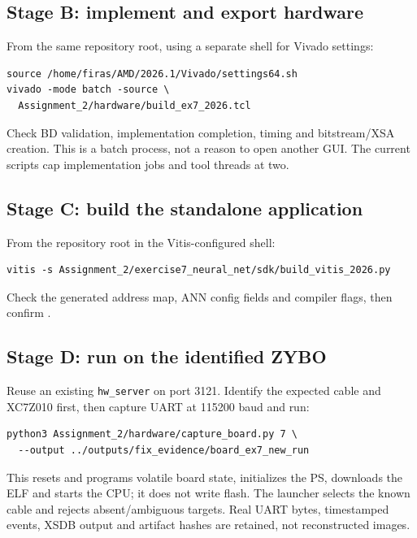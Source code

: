 \documentclass[11pt,a4paper]{article}
\begin{document}
\subsection*{Stage B: implement and export hardware}
From the same repository root, using a separate shell for Vivado settings:
\begin{lstlisting}
source /home/firas/AMD/2026.1/Vivado/settings64.sh
vivado -mode batch -source \
  Assignment_2/hardware/build_ex7_2026.tcl
\end{lstlisting}
Check BD validation, implementation completion, timing and bitstream/XSA
creation. This is a batch process, not a reason to open another GUI. The current
scripts cap implementation jobs and tool threads at two.

\subsection*{Stage C: build the standalone application}
From the repository root in the Vitis-configured shell:
\begin{lstlisting}
vitis -s Assignment_2/exercise7_neural_net/sdk/build_vitis_2026.py
\end{lstlisting}
Check the generated address map, ANN config fields and compiler flags, then
confirm .

\subsection*{Stage D: run on the identified ZYBO}
Reuse an existing \texttt{hw\_server} on port 3121. Identify the expected cable
and XC7Z010 first, then capture UART at 115200 baud and run:
\begin{lstlisting}
python3 Assignment_2/hardware/capture_board.py 7 \
  --output ../outputs/fix_evidence/board_ex7_new_run
\end{lstlisting}
This resets and programs volatile board state, initializes the PS, downloads
the ELF and starts the CPU; it does not write flash. The launcher selects the
known cable and rejects absent/ambiguous targets. Real UART bytes, timestamped
events, XSDB output and artifact hashes are retained, not reconstructed images.

\newpage
\end{document}
